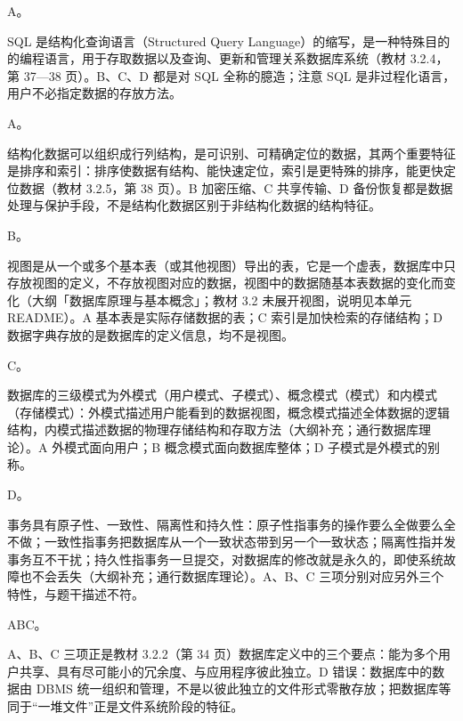 \documentclass[a4paper,11pt]{article}
\begin{document}
\q A。\begin{analysis}SQL 是结构化查询语言（Structured Query Language）的缩写，是一种特殊目的的编程语言，用于存取数据以及查询、更新和管理关系数据库系统（教材 3.2.4，第 37—38 页）。B、C、D 都是对 SQL 全称的臆造；注意 SQL 是非过程化语言，用户不必指定数据的存放方法。\end{analysis}

\q A。\begin{analysis}结构化数据可以组织成行列结构，是可识别、可精确定位的数据，其两个重要特征是排序和索引：排序使数据有结构、能快速定位，索引是更特殊的排序，能更快定位数据（教材 3.2.5，第 38 页）。B 加密压缩、C 共享传输、D 备份恢复都是数据处理与保护手段，不是结构化数据区别于非结构化数据的结构特征。\end{analysis}

\q B。\begin{analysis}视图是从一个或多个基本表（或其他视图）导出的表，它是一个虚表，数据库中只存放视图的定义，不存放视图对应的数据，视图中的数据随基本表数据的变化而变化（大纲「数据库原理与基本概念」；教材 3.2 未展开视图，说明见本单元 README）。A 基本表是实际存储数据的表；C 索引是加快检索的存储结构；D 数据字典存放的是数据库的定义信息，均不是视图。\end{analysis}

\q C。\begin{analysis}数据库的三级模式为外模式（用户模式、子模式）、概念模式（模式）和内模式（存储模式）：外模式描述用户能看到的数据视图，概念模式描述全体数据的逻辑结构，内模式描述数据的物理存储结构和存取方法（大纲补充；通行数据库理论）。A 外模式面向用户；B 概念模式面向数据库整体；D 子模式是外模式的别称。\end{analysis}

\q D。\begin{analysis}事务具有原子性、一致性、隔离性和持久性：原子性指事务的操作要么全做要么全不做；一致性指事务把数据库从一个一致状态带到另一个一致状态；隔离性指并发事务互不干扰；持久性指事务一旦提交，对数据库的修改就是永久的，即使系统故障也不会丢失（大纲补充；通行数据库理论）。A、B、C 三项分别对应另外三个特性，与题干描述不符。\end{analysis}


\q ABC。\begin{analysis}A、B、C 三项正是教材 3.2.2（第 34 页）数据库定义中的三个要点：能为多个用户共享、具有尽可能小的冗余度、与应用程序彼此独立。D 错误：数据库中的数据由 DBMS 统一组织和管理，不是以彼此独立的文件形式零散存放；把数据库等同于“一堆文件”正是文件系统阶段的特征。\end{analysis}
\end{document}
